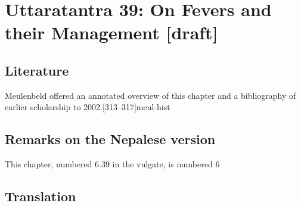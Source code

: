 
\chapter{Uttaratantra 39:  On Fevers and their Management [draft]}

\section{Literature} 

Meulenbeld offered an annotated overview of this chapter and a bibliography
of earlier scholarship to 2002.[313--317]{meul-hist} 

\section{Remarks on the Nepalese version}

This chapter, numbered 6.39 in the vulgate, is numbered 6

\section{Translation}

